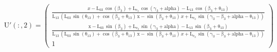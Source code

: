 \documentclass[]{article}
\begin{document}
\begin{equation*}
\mathrm{U'(:, 2)} = \left(\begin{array}{c} \frac{x - \mathrm{\mathrm{L_{03}}}\, \cos\!\left(\mathrm{\mathrm{\beta_3}}\right) + \mathrm{\mathrm{L_{e_3}}}\, \cos\!\left(\mathrm{\mathrm{\gamma_3}} + \mathrm{alpha}\right) - \mathrm{\mathrm{L_{13}}}\, \cos\!\left(\mathrm{\mathrm{\beta_3}} + \mathrm{\theta_{13}}\right)}{\mathrm{\mathrm{L_{13}}}\, \left(\mathrm{\mathrm{L_{03}}}\, \sin\!\left(\mathrm{\theta_{13}}\right) + \cos\!\left(\mathrm{\mathrm{\beta_3}} + \mathrm{\theta_{13}}\right)\, \mathrm{x} - \sin\!\left(\mathrm{\mathrm{\beta_3}} + \mathrm{\theta_{13}}\right)\, x + \mathrm{\mathrm{L_{e_3}}}\, \sin\!\left(\mathrm{\mathrm{\gamma_3}} - \mathrm{\mathrm{\beta_3}} + \mathrm{alpha} - \mathrm{\theta_{13}}\right)\right)}\\ \frac{\mathrm{x} - \mathrm{\mathrm{L_{03}}}\, \sin\!\left(\mathrm{\mathrm{\beta_3}}\right) + \mathrm{\mathrm{L_{e_3}}}\, \sin\!\left(\mathrm{\mathrm{\gamma_3}} + \mathrm{alpha}\right) - \mathrm{\mathrm{L_{13}}}\, \sin\!\left(\mathrm{\mathrm{\beta_3}} + \mathrm{\theta_{13}}\right)}{\mathrm{\mathrm{L_{13}}}\, \left(\mathrm{\mathrm{L_{03}}}\, \sin\!\left(\mathrm{\theta_{13}}\right) + \cos\!\left(\mathrm{\mathrm{\beta_3}} + \mathrm{\theta_{13}}\right)\, \mathrm{x} - \sin\!\left(\mathrm{\mathrm{\beta_3}} + \mathrm{\theta_{13}}\right)\, x + \mathrm{\mathrm{L_{e_3}}}\, \sin\!\left(\mathrm{\mathrm{\gamma_3}} - \mathrm{\mathrm{\beta_3}} + \mathrm{alpha} - \mathrm{\theta_{13}}\right)\right)}\\ 1 \end{array}\right)
\end{equation*}
\end{document}
